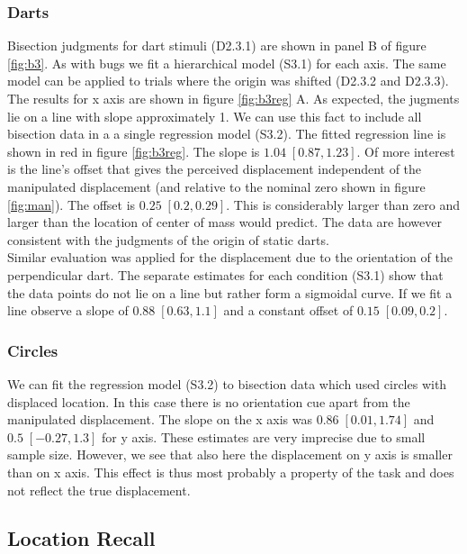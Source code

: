 \documentclass[10pt]{article}
\begin{document}
\subsubsection*{Darts}
Bisection judgments for dart stimuli (D2.3.1) are shown in panel B of figure \ref{fig:b3}. As with bugs we fit a hierarchical model (S3.1) for each axis. The same model can be applied to trials where the origin was shifted (D2.3.2 and D2.3.3). The results for x axis are shown in figure \ref{fig:b3reg} A. As expected, the jugments lie on a line with slope approximately 1. We can use this fact to include all bisection data in a a single regression model (S3.2). The fitted regression line is shown in red in figure \ref{fig:b3reg}. The slope is $1.04\; [0.87,1.23]$. Of more interest is the line's offset that gives the perceived displacement independent of the manipulated displacement (and relative to the nominal zero shown in figure \ref{fig:man}). The offset is $0.25\; [0.2,0.29]$. This is considerably larger than zero and larger than the location of center of mass would predict. The data are however consistent with the judgments of the origin of static darts.\\
Similar evaluation was applied for the displacement due to the orientation of the perpendicular dart. The separate estimates for each condition (S3.1) show that the data points do not lie on a line but rather form a sigmoidal curve. If we fit a line observe a slope of $0.88\; [0.63,1.1]$ and a constant offset of $0.15\; [0.09,0.2]$.

\subsubsection*{Circles}
We can fit the regression model (S3.2) to bisection data which used circles with displaced location. In this case there is no orientation cue apart from the manipulated displacement. The slope on the x axis was $0.86\; [0.01,1.74]$ and $0.5 \;[-0.27,1.3]$ for y axis. These estimates are very imprecise due to small sample size. However, we see that also here the displacement on y axis is smaller than on x axis. This effect is thus most probably a property of the task and does not reflect the true displacement.   

\subsection*{Location Recall} 
\end{document}
